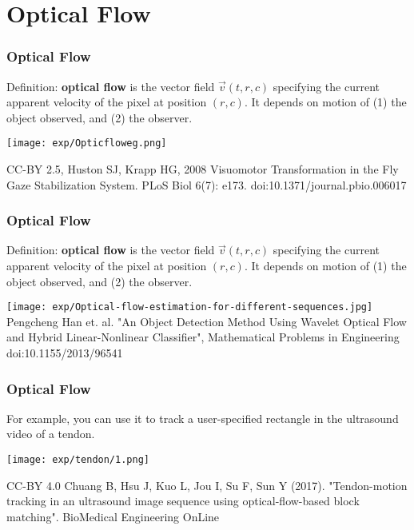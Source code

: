 \documentclass{beamer}
\begin{document}
\section[Flow]{Optical Flow}
\setcounter{subsection}{1}

\begin{frame}
  \frametitle{Optical Flow}

  Definition: {\bf optical flow} is the vector field $\vec{v}(t,r,c)$
  specifying the current apparent velocity of the pixel at position
  $(r,c)$.  It depends on motion of (1) the object observed, and (2)
  the observer.
  
  {\centering
    \texttt{[image: exp/Opticfloweg.png]}

    {\tiny
      CC-BY 2.5, Huston SJ, Krapp HG, 2008 Visuomotor Transformation
      in the Fly Gaze Stabilization System. PLoS Biol 6(7):
      e173. doi:10.1371/journal.pbio.006017
    }
  }
\end{frame}

\begin{frame}
  \frametitle{Optical Flow}

  Definition: {\bf optical flow} is the vector field $\vec{v}(t,r,c)$
  specifying the current apparent velocity of the pixel at position
  $(r,c)$.  It depends on motion of (1) the object observed, and (2)
  the observer.

  {\centering
    \texttt{[image: exp/Optical-flow-estimation-for-different-sequences.jpg]}\\

    {\tiny
      Pengcheng Han et. al. "An Object Detection Method Using Wavelet
      Optical Flow and Hybrid Linear-Nonlinear Classifier",
      Mathematical Problems in Engineering doi:10.1155/2013/96541
    }
  }
\end{frame}

\begin{frame}
  \frametitle{Optical Flow}

  For example, you can use it to track a user-specified rectangle in
  the ultrasound video of a tendon.

  {\centering
    \ifdefined\novideo
    \texttt{[image: exp/tendon/1.png]}
    \else
    \fi

    {\tiny
      CC-BY 4.0 Chuang B, Hsu J, Kuo L, Jou I, Su F, Sun Y
      (2017). "Tendon-motion tracking in an ultrasound image sequence
      using optical-flow-based block matching". BioMedical Engineering
      OnLine
    }
  }
\end{frame}
\end{document}
